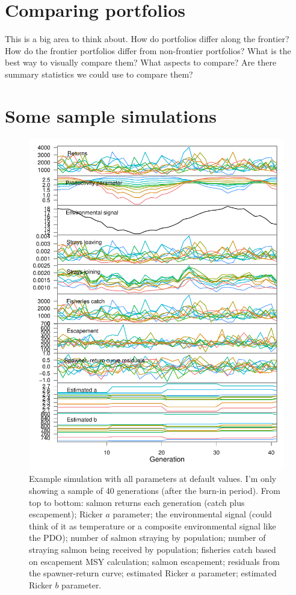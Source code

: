 \documentclass[12pt]{article}
\begin{document}
\section{Comparing portfolios}

This is a big area to think about. How do portfolios differ along the
frontier? How do the frontier portfolios differ from non-frontier
portfolios? What is the best way to visually compare them? What aspects
to compare? Are there summary statistics we could use to compare them?

\section{Some sample simulations}

\begin{figure}[htbp]
\centering
\includegraphics{figure/run-base-example1.pdf}
\caption{Example simulation with all parameters at default values. I'm
only showing a sample of 40 generations (after the burn-in period). From
top to bottom: salmon returns each generation (catch plus escapement);
Ricker $a$ parameter; the environmental signal (could think of it as
temperature or a composite environmental signal like the PDO); number of
salmon straying by population; number of straying salmon being received
by population; fisheries catch based on escapement MSY calculation;
salmon escapement; residuals from the spawner-return curve; estimated
Ricker $a$ parameter; estimated Ricker $b$ parameter.}
\end{figure}
\end{document}
